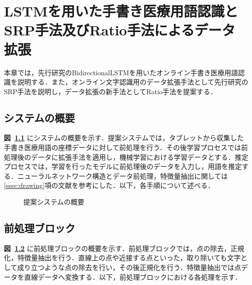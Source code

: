 
\chapter{LSTMを用いた手書き医療用語認識とSRP手法及びRatio手法によるデータ拡張}
\label{cha:propose}
本章では，先行研究\cite{takahashi}のBidirectionalLSTMを用いたオンライン手書き医療用語認識を説明する．また，オンライン文字認識用のデータ拡張手法として先行研究のSRP手法を説明し，データ拡張の新手法としてRatio手法を提案する．
\section{システムの概要}
\label{sec:concept}
\textbf{図~\ref{sys_concept}} にシステムの概要を示す．提案システムでは，タブレットから収集した手書き医療用語の座標データに対して前処理を行う．その後学習プロセスでは前処理後のデータに拡張手法を適用し，機械学習における学習データとする．推定プロセスでは，学習を行ったモデルに前処理後のデータを入力し，用語を推定する．ニューラルネットワーク構造とデータ前処理，特徴量抽出に関しては\ref{ssec:drawing}項の文献\cite{takahashi}を参考にした．以下，各手順について述べる．

\begin{figure}[tb]
 \begin{center}
  \caption{提案システムの概要}
  \label{sys_concept}
\end{center}
\end{figure}

\section{前処理ブロック}
\label{preprocess}
\textbf{図~\ref{preprocess}} に前処理ブロックの概要を示す．前処理ブロックでは，点の除去，正規化，特徴量抽出を行う．直線上の点や近接する点といった，取り除いても文字として成り立つような点の除去を行い，その後正規化を行う．特徴量抽出では点データを直線データへ変換する．以下，前処理ブロックにおける各処理を示す．

